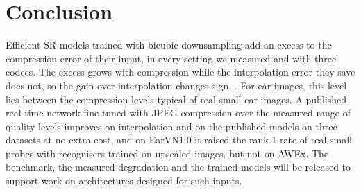 \section{Conclusion}
Efficient SR models trained with bicubic downsampling add an excess to the compression error of their input, in every setting we measured and with three codecs. The excess grows with compression while the interpolation error they save does not, so the gain over interpolation changes sign. \KeyFinding. For ear images, this level lies between the compression levels typical of real small ear images. A published real-time network fine-tuned with JPEG compression over the measured range of quality levels improves on interpolation and on the published models on three datasets at no extra cost, and on EarVN1.0 it raised the rank-1 rate of real small probes with recognisers trained on upscaled images, but not on AWEx. The benchmark, the measured degradation and the trained models will be released to support work on architectures designed for such inputs.
